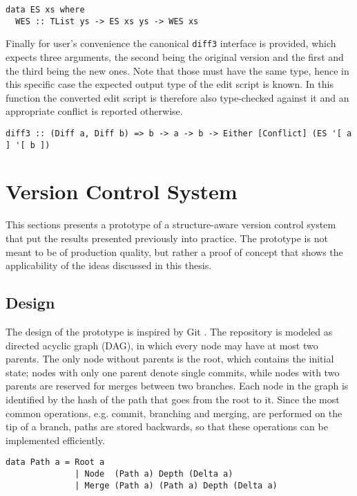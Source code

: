 \documentclass[../Thesis.tex]{subfiles}
\begin{document}
\begin{verbatim}
data ES xs where
  WES :: TList ys -> ES xs ys -> WES xs
\end{verbatim}

	Finally for user's convenience the canonical \texttt{diff3} interface is
	provided, which expects three arguments, the second 
	being the original version and the first and the third being the new ones.
	Note that those must have the same type, hence in this specific
	case the expected output type of the edit script is known.
	In this function the converted edit script is therefore also type-checked 
	against it and an appropriate conflict is reported otherwise.
	
\begin{verbatim}
diff3 :: (Diff a, Diff b) => b -> a -> b -> Either [Conflict] (ES '[ a ] '[ b ])
\end{verbatim}

	\section{Version Control System}
	This sections presents a prototype of a structure-aware version control 
	system that put the results presented previously into practice.
	The prototype is not meant to be of production quality, but rather
	a proof of concept that shows the applicability of the ideas discussed 
	in this thesis.
	
	\subsection{Design}	
	The design of the prototype is inspired by Git \cite{GIT}.
	The repository is modeled as directed acyclic graph (DAG), in 
	which every node may have at most two parents. The only node without
	parents is the root, which contains the initial state; nodes
	with only one parent denote single commits, while nodes with
	two parents are reserved for merges between two 	branches.
	Each node in the graph is identified by the hash of the path that
	goes from the root to it.
	Since the most common operations, e.g. commit, branching and merging,
	are performed on the tip of a branch, paths are stored backwards,
	so that these operations can be implemented efficiently.
	
\begin{verbatim}
data Path a = Root a
              | Node  (Path a) Depth (Delta a)
              | Merge (Path a) (Path a) Depth (Delta a)
\end{verbatim}
			
\end{document}
